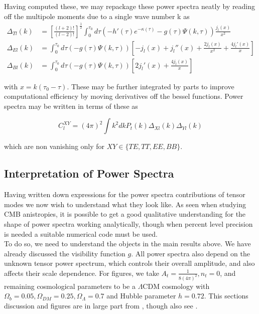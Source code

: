 \documentclass[a4paper,10pt]{article}
\newcommand{\half}{\frac{1}{2}}
\newcommand{\ltwo}{\left[\frac{(l+2)!}{(l-2)!}\right]}
\begin{document}
Having computed these, we may repackage these power spectra neatly by reading off the multipole moments due to a single wave number k as 
\begin{equation}
\begin{split}
\Delta_{Tl}(k) &= \ltwo^\half \int_0^{\tau_0} d\tau \left(-h'(\tau)e^{-\kappa(\tau)}-g(\tau)\Psi(k,\tau)\right)\frac{j_l(x)}{x^2}\\
\Delta_{El}(k) &= \int_0^{\tau_0}d\tau  \left(-g(\tau)\Psi(k,\tau)\right)\left[-j_l(x) +j_l''(x)+\frac{2j_l(x)}{x^2} + \frac{4j_l'(x)}{x}\right]\\
\Delta_{Bl}(k) &= \int_0^{\tau_0} d\tau \left(-g(\tau)\Psi(k,\tau)\right)\left[2j_l'(x)+\frac{4j_l(x)}{x}\right]
\end{split}
\end{equation}
 
with $x=k(\tau_0-\tau)$. These may be further integrated by parts to improve computational efficiency by moving derivatives off the bessel functions. Power spectra may be written in terms of these as 

\begin{equation}
C_l^{XY} = (4\pi)^2 \int k^2 dk P_t(k) \Delta_{Xl}(k)\Delta_{Yl}(k)
\end{equation}

which are non vanishing only for $XY \in \{TE, TT, EE, BB\}$. 

\subsection{Interpretation of Power Spectra}
\label{interpretation}

Having written down expressions for the power spectra contributions of tensor modes we now wish to understand what they look like. As seen when studying CMB anistropies, it is possible to get a good qualitative understanding for the shape of power spectra working analytically, though when percent level precision is needed a suitable numerical code must be used.\\

To do so, we need to understand the objects in the main results above. We have already discussed the visibility function $g$. All power spectra also depend on the unknown tensor power spectrum, which controls their overall amplitude, and also affects their scale dependence. For figures, we take  $A_t = \frac{1}{8(4\pi)^2}, n_t=0$, and remaining cosmological parameters to be a $\Lambda$CDM cosmology with $\Omega_b=0.05, \Omega_{DM}=0.25, \Omega_\Lambda=0.7$ and Hubble parameter $h=0.72$. This sections discussion and figures are in large part from \cite{Pritchard}, though also see \cite{zhao}.\\
\end{document}
